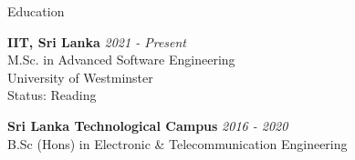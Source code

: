 \documentclass[
	11pt, %
]{./assets/resume} %
\begin{document}

\begin{rSection}{Education}

	\textbf{IIT, Sri Lanka} \hfill \textit{2021 - Present} \\ 
	M.Sc. in Advanced Software Engineering \\
	University of Westminster \\
	Status: Reading

	\textbf{Sri Lanka Technological Campus} \hfill \textit{2016 - 2020} \\ 
    B.Sc (Hons) in Electronic \& Telecommunication Engineering \\
	
	
\end{rSection}

\end{document}
